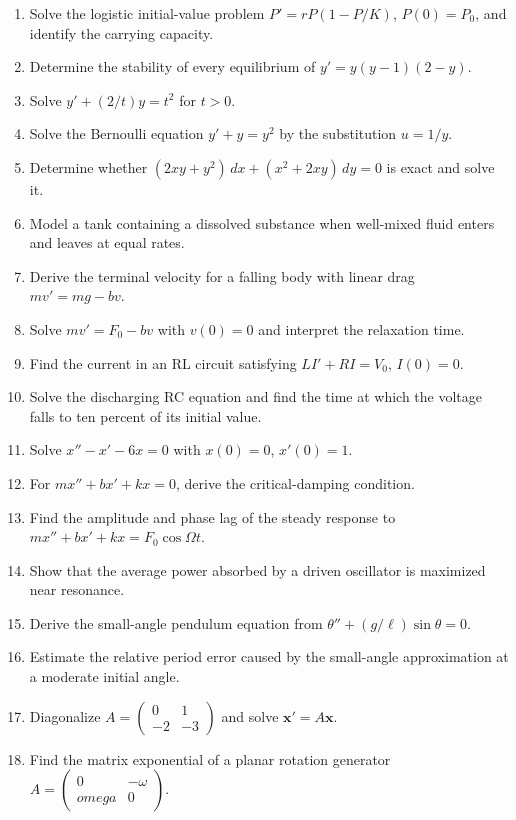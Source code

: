 \begin{enumerate}[label=\textbf{\arabic*.},leftmargin=*]
\item Solve the logistic initial-value problem $P'=rP(1-P/K)$, $P(0)=P_0$, and identify the carrying capacity.
\item Determine the stability of every equilibrium of $y'=y(y-1)(2-y)$.
\item Solve $y'+(2/t)y=t^2$ for $t>0$.
\item Solve the Bernoulli equation $y'+y=y^2$ by the substitution $u=1/y$.
\item Determine whether $(2xy+y^2)\,dx+(x^2+2xy)\,dy=0$ is exact and solve it.
\item Model a tank containing a dissolved substance when well-mixed fluid enters and leaves at equal rates.
\item Derive the terminal velocity for a falling body with linear drag $m v'=mg-bv$.
\item Solve $m v'=F_0-bv$ with $v(0)=0$ and interpret the relaxation time.
\item Find the current in an RL circuit satisfying $L I'+RI=V_0$, $I(0)=0$.
\item Solve the discharging RC equation and find the time at which the voltage falls to ten percent of its initial value.
\item Solve $x''-x'-6x=0$ with $x(0)=0$, $x'(0)=1$.
\item For $m x''+b x'+kx=0$, derive the critical-damping condition.
\item Find the amplitude and phase lag of the steady response to $m x''+b x'+kx=F_0\cos\Omega t$.
\item Show that the average power absorbed by a driven oscillator is maximized near resonance.
\item Derive the small-angle pendulum equation from $\theta''+(g/\ell)\sin\theta=0$.
\item Estimate the relative period error caused by the small-angle approximation at a moderate initial angle.
\item Diagonalize $A=\begin{pmatrix}0&1\\-2&-3\end{pmatrix}$ and solve $\mathbf x'=A\mathbf x$.
\item Find the matrix exponential of a planar rotation generator $A=\begin{pmatrix}0&-\omega\\omega&0\end{pmatrix}$.

\end{enumerate}
